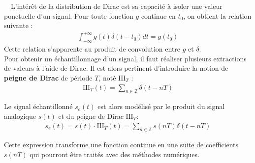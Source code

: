 ~\
L'intérêt de la distribution de Dirac est sa capacité à isoler une valeur ponctuelle d'un signal. Pour toute fonction $g$ continue en $t_0$, on obtient la relation suivante :
\begin{align*}
    \int_{-\infty}^{+\infty} g(t) \delta(t-t_0) dt = g(t_0)
\end{align*}
\remarque Cette relation s'apparente au produit de convolution entre $g$ et $\delta$. \\

Pour obtenir un échantillonnage d'un signal, il faut réaliser plusieurs extractions de valeurs à l'aide de Dirac. Il est alors pertinent d'introduire la notion de \textbf{peigne de Dirac} de période $T$, noté $\text{III}_{T}$ :
\begin{align*}
    \text{III}_{T}(t) = \sum_{n\in\mathbb{Z}} \delta(t - nT)
\end{align*}

\begin{center}
\end{center}

Le signal échantillonné $s_e(t)$ est alors modélisé par le produit du signal analogique $s(t)$ et du peigne de Dirac $\text{III}_{T}$:
\begin{align*}
    s_e(t) = s(t) \cdot \text{III}_{T}(t) = \sum_{n\in\mathbb{Z}} s(nT) \delta(t - nT)
\end{align*}

Cette expression transforme une fonction continue en une suite de coefficients $s(nT)$ qui pourront être traités avec des méthodes numériques.

\begin{center}
\end{center}